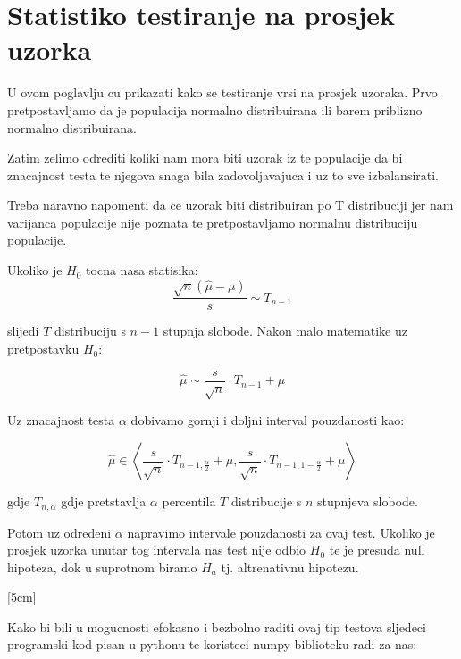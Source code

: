 \chapter{Statistiko testiranje na prosjek uzorka}

U ovom poglavlju cu prikazati kako se testiranje vrsi na prosjek uzoraka. Prvo pretpostavljamo da je populacija normalno distribuirana ili barem priblizno normalno distribuirana.

Zatim zelimo odrediti koliki nam mora biti uzorak iz te populacije da bi znacajnost testa te njegova snaga bila zadovoljavajuca i uz to sve izbalansirati. 


Treba naravno napomenti da ce uzorak biti distribuiran po T distribuciji jer nam varijanca populacije nije poznata te pretpostavljamo normalnu distribuciju populacije.

Ukoliko je $H_0$ tocna nasa statisika: \[\frac{\sqrt{n} (\hat{\mu} - \mu)}{s} \sim T_{n-1}\]

slijedi $T$ distribuciju s $n-1$ stupnja slobode. Nakon malo matematike uz pretpostavku $H_0$:

\[
\hat{\mu} \sim \frac{s}{\sqrt{n}} \cdot T_{n-1} + \mu
\]

Uz znacajnost testa $\alpha$ dobivamo gornji i doljni interval pouzdanosti kao:

\[
\hat{\mu} \in \left< \frac{s}{\sqrt{n}} \cdot T_{n-1, \frac{\alpha}{2}} + \mu, \frac{s}{\sqrt{n}} \cdot T_{n-1, 1 - \frac{\alpha}{2}} + \mu \right>
\]

gdje $T_{n, \alpha}$ gdje pretstavlja $\alpha$ percentila $T$ distribucije s $n$ stupnjeva slobode.

Potom uz odredeni $\alpha$ napravimo intervale pouzdanosti za ovaj test. Ukoliko je prosjek uzorka unutar tog intervala nas test nije odbio $H_0$ te je presuda null hipoteza, dok u suprotnom biramo $H_a$ tj. altrenativnu hipotezu.


[5cm]

Kako bi bili u mogucnosti efokasno i bezbolno raditi ovaj tip testova sljedeci programski kod pisan u pythonu te koristeci numpy biblioteku radi za nas:

